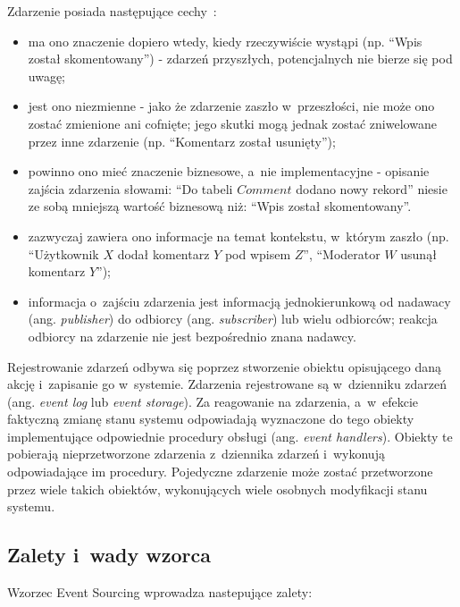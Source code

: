 Zdarzenie posiada następujące cechy~\cite{eventSourcing_intro}:

\begin{itemize}
 \item ma ono znaczenie dopiero wtedy, kiedy rzeczywiście wystąpi (np. ``Wpis został skomentowany'') - zdarzeń przyszłych, potencjalnych nie bierze się pod uwagę;
 \item jest ono niezmienne - jako że zdarzenie zaszło w~przeszłości, nie może ono zostać zmienione ani cofnięte; jego skutki mogą jednak zostać zniwelowane przez inne zdarzenie (np. ``Komentarz został usunięty'');
 \item powinno ono mieć znaczenie biznesowe, a~nie implementacyjne - opisanie zajścia zdarzenia słowami: ``Do tabeli $Comment$ dodano nowy rekord'' niesie ze sobą mniejszą wartość biznesową niż: ``Wpis został skomentowany''.
 \item zazwyczaj zawiera ono informacje na temat kontekstu, w~którym zaszło (np. ``Użytkownik $X$ dodał komentarz $Y$ pod wpisem $Z$'', ``Moderator $W$ usunął komentarz $Y$'');
 \item informacja o~zajściu zdarzenia jest informacją jednokierunkową od nadawacy (ang. \emph{publisher}) do odbiorcy (ang. \emph{subscriber}) lub wielu odbiorców; reakcja odbiorcy na zdarzenie nie jest bezpośrednio znana nadawcy.\\
\end{itemize}

Rejestrowanie zdarzeń odbywa się poprzez stworzenie obiektu opisującego daną akcję i~zapisanie go w~systemie.
Zdarzenia rejestrowane są w~dzienniku zdarzeń (ang. \emph{event log} lub \emph{event storage}).
Za reagowanie na zdarzenia, a~w~efekcie faktyczną zmianę stanu systemu odpowiadają wyznaczone do tego obiekty implementujące odpowiednie procedury obsługi (ang. \emph{event handlers}).
Obiekty te pobierają nieprzetworzone zdarzenia z~dziennika zdarzeń i~wykonują odpowiadające im procedury.
Pojedyczne zdarzenie może zostać przetworzone przez wiele takich obiektów, wykonujących wiele osobnych modyfikacji stanu systemu.


\subsection{Zalety i~wady wzorca}

Wzorzec Event Sourcing wprowadza nastepujące zalety:

